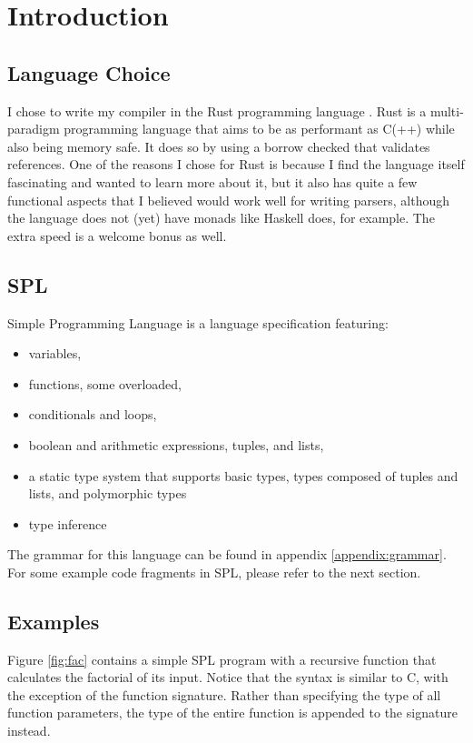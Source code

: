 \chapter{Introduction}

\section{Language Choice}
I chose to write my compiler in the Rust programming language \cite{rust}. Rust is a multi-paradigm programming language that aims to be as performant as C(++) while also being memory safe. It does so by using a borrow checked that validates references. One of the reasons I chose for Rust is because I find the language itself fascinating and wanted to learn more about it, but it also has quite a few functional aspects that I believed would work well for writing parsers, although the language does not (yet) have monads like Haskell does, for example. The extra speed is a welcome bonus as well.

\section{SPL}
Simple Programming Language is a language specification featuring:

\begin{itemize}
    \item variables,
    \item functions, some overloaded,
    \item conditionals and loops,
    \item boolean and arithmetic expressions, tuples, and lists,
    \item a static type system that supports basic types, types composed of tuples and lists, and polymorphic types
    \item type inference
\end{itemize}

The grammar for this language can be found in appendix \ref{appendix:grammar}. For some example code fragments in SPL, please refer to the next section.

\section{Examples}
Figure \ref{fig:fac} contains a simple SPL program with a recursive function that calculates the factorial of its input. Notice that the syntax is similar to C, with the exception of the function signature. Rather than specifying the type of all function parameters, the type of the entire function is appended to the signature instead.

